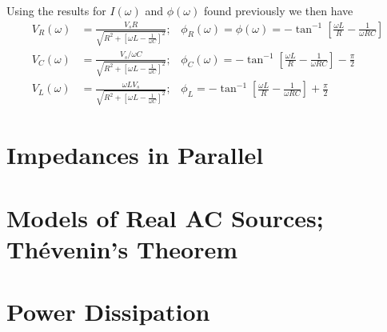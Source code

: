 Using the results for $I(\omega)$ and $\phi(\omega)$ found previously we then have \begin{align*}
    V_R(\omega) &= \frac{V_sR}{\sqrt{R^2+\left[\omega L-\frac{1}{\omega C}\right]^2}};\;\;\;\phi_R(\omega) = \phi(\omega) = -\tan^{-1}\left[\frac{\omega L}{R} - \frac{1}{\omega RC}\right] \\
    V_C(\omega) &= \frac{V_s/\omega C}{\sqrt{R^2+\left[\omega L-\frac{1}{\omega C}\right]^2}};\;\;\;\phi_C(\omega) = -\tan^{-1}\left[\frac{\omega L}{R} - \frac{1}{\omega RC}\right] - \frac{\pi}{2} \\
    V_L(\omega) &= \frac{\omega LV_s}{\sqrt{R^2+\left[\omega L-\frac{1}{\omega C}\right]^2}};\;\;\;\phi_L = -\tan^{-1}\left[\frac{\omega L}{R} - \frac{1}{\omega RC}\right] + \frac{\pi}{2}
\end{align*}





\chapter{Impedances in Parallel}


\chapter{Models of Real AC Sources; Th\'{e}venin's Theorem}


\chapter{Power Dissipation}

